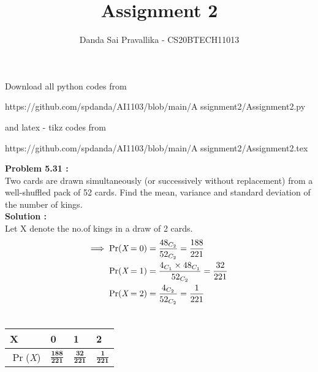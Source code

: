 \documentclass[journal,12pt,twocolumn]{IEEEtran}
\title{Assignment 2}
\author{Danda Sai Pravallika  - CS20BTECH11013}
\begin{document}
\maketitle
Download all python codes from
\begin{tcolorbox}
https://github.com/spdanda/AI1103/blob/main/A
ssignment2/Assignment2.py
\end{tcolorbox}
and latex - tikz codes from 
\begin{tcolorbox}
https://github.com/spdanda/AI1103/blob/main/A
ssignment2/Assignment2.tex
\end{tcolorbox}
\large\textbf{Problem 5.31 :}\\
Two cards are drawn simultaneously (or successively without replacement) from a well-shuffled  pack  of  52  cards.  Find  the  mean, variance and standard deviation of the number of kings.\\
\textbf{Solution :}\\
Let X denote the no.of kings in a draw of 2 cards.
\begin{align}
\Longrightarrow\; \Pr(\emph{X}=0) &= \dfrac{48_{C_2}}{52_{C_2}}=\dfrac{188}{221} \\
\Pr(\emph{X}=1) &= \dfrac{4_{C_1} \times48_{C_1}}{52_{C_2}}=\dfrac{32}{221} \\ 
\Pr(\emph{X}=2)&=\dfrac{4_{C_2}}{52_{C_2}}= \dfrac{1}{221}\\ \nonumber
\end{align}

\begin{center}
\begin{tabular}{ | m{1.5cm} | m{1.75cm}| m{1.75cm} | m{1.75cm} | } 
\hline \vspace{2pt}

X     & \hspace{0.5cm}0                & \hspace{0.5cm}1               & \hspace{0.5cm}2             \\ \hline \vspace{8pt}
\(\Pr\)(\emph{X}) & \hspace{0.5cm}\(\frac{\textbf{188}}{\textbf{221}}\) & \hspace{0.5cm}\(\frac{\textbf{32}}{\textbf{221}}\) & \;\;\;\(\frac{\textbf{1}}{\textbf{221}}\)\\ 
\hline
\end{tabular}
\label{tab:B-1}
\end{center}
\newpage
\end{document}
